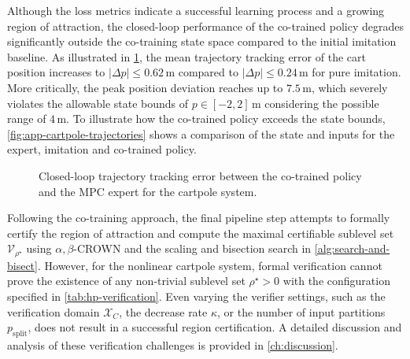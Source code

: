 Although the loss metrics indicate a successful learning process and a growing region of attraction, 
the closed-loop performance of the co-trained policy degrades significantly outside the co-training state space 
compared to the initial imitation baseline. 
As illustrated in \cref{fig:cp-colearn-policy-error-bands}, the mean trajectory tracking error of the 
cart position increases to $|\Delta p| \le 0.62\,\text{m}$ compared to $|\Delta p| \le 0.24\,\text{m}$ for pure imitation. 
More critically, the peak position deviation reaches up to $7.5\,\text{m}$, which severely violates the 
allowable state bounds of $p \in [-2, 2]\,\text{m}$ considering the possible range of $4\,\text{m}$.
To illustrate how the co-trained policy exceeds the state bounds, \cref{fig:app-cartpole-trajectories} shows a 
comparison of the state and inputs for the expert, imitation and co-trained policy.
\begin{figure}[htbp]
    \centering
    
    \caption{Closed-loop trajectory tracking error between the co-trained policy and the MPC expert for the cartpole system.}
    \label{fig:cp-colearn-policy-error-bands}
\end{figure}

Following the co-training approach, the final pipeline step attempts to formally certify the region of 
attraction and compute the maximal certifiable sublevel set $\mathcal{V}_{\rho^\star}$ using $\alpha,\beta$-CROWN 
and the scaling and bisection search in \cref{alg:search-and-bisect}. 
However, for the nonlinear cartpole system, formal verification cannot prove the existence of any non-trivial 
sublevel set $\rho^\star > 0$ with the configuration specified in \cref{tab:hp-verification}. 
Even varying the verifier settings, such as the verification domain $\mathcal{X}_C$, the decrease rate $\kappa$, 
or the number of input partitions $p_{\mathrm{split}}$, does not result in a successful region certification.
A detailed discussion and analysis of these verification challenges is provided in \cref{ch:discussion}.